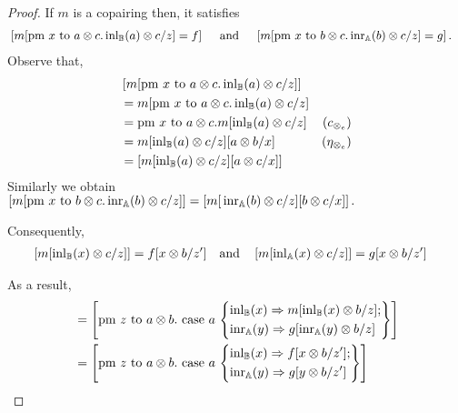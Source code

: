\documentclass[10pt,a4paper]{amsart}
\theoremstyle{definition}
\theoremstyle{definition}
\theoremstyle{definition}
\theoremstyle{definition}
\theoremstyle{definition}
\theoremstyle{definition}
\begin{document}
\begin{proof}
  If $m$ is a copairing then, it satisfies 
  \begin{align*}
    & \left[m [\text{pm } x \text{ to } a\otimes c. \, \mathrm{inl}_{\mathbb{B}}(a) \otimes c/ z] = f \right] \quad \text{ and } \quad \left[m [\text{pm } x \text{ to } b\otimes c. \, \mathrm{inr}_{\mathbb{A}}(b) \otimes c/ z] = g \right].
  \end{align*}
  Observe that,
  \begin{align*}
    & \left[m [\text{pm } x \text{ to } a\otimes c. \, \mathrm{inl}_{\mathbb{B}}(a) \otimes c/ z]  \right] \\
    & = m [\text{pm }x \text{ to } a\otimes c. \, \mathrm{inl}_{\mathbb{B}}(a) \otimes c/ z]   \\
    & = \text{pm }x \text{ to } a\otimes c. m[\mathrm{inl}_{\mathbb{B}}(a) \otimes c/ z] & (c_{\otimes_e})\\
    & = m[\mathrm{inl}_{\mathbb{B}}(a) \otimes c/ z] [a \otimes b/ x] & (\eta_{\otimes_e}) \\
    & = \left[  m[\mathrm{inl}_{\mathbb{B}}(a) \otimes c/ z] [a \otimes c/ x] \right]
  \end{align*}
  Similarly we obtain $\left[m [\text{pm } x \text{ to } b\otimes c. \, \mathrm{inr}_{\mathbb{A}}(b) \otimes c/ z]  \right] = \left[m [ \, \mathrm{inr}_{\mathbb{A}}(b) \otimes c/ z] [b \otimes c/ x]  \right]. $

  Consequently,
   \begin{align*}
    &  \left[  m[\mathrm{inl}_{\mathbb{B}}(x) \otimes c/ z] \right] = f[x \otimes b/z'] \quad \text{and} \quad  \left[  m[\mathrm{inl}_{\mathbb{A}}(x) \otimes c/ z] \right] = g[x \otimes b/z']
  \end{align*}

  As a result,
  \begin{align*}
    [m] 
    & = \left[\text{pm } z \text{ to } a \otimes b. \text{ case } a\, \left\{ \begin{aligned}
      & \inl_{\typeB}(x) \Rightarrow m[\inl_{\typeB}(x) \otimes b/z];\\
      & \inr_{\typeA}(y) \Rightarrow g [\inr_{\typeA}(y) \otimes b/z]
    \end{aligned}
      \right\}
      \right]\\
    &= \left[\text{pm } z \text{ to } a \otimes b. \text{ case } a\, \left\{ \begin{aligned}
      & \inl_{\typeB}(x) \Rightarrow f[x \otimes b/z'];\\
      & \inr_{\typeA}(y) \Rightarrow g [y \otimes b/z']
    \end{aligned}
      \right\}
      \right]
  \end{align*}



\end{proof}
\end{document}
